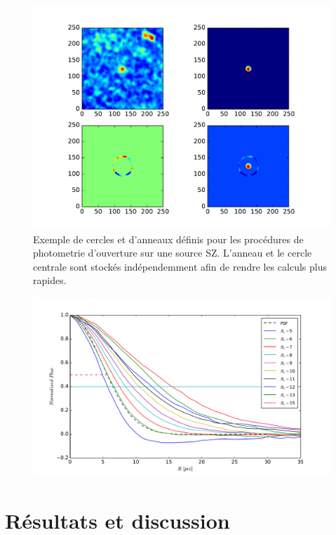 \documentclass[a4paper,11pt]{article}
\begin{document}
\begin{figure}[h!]
  \centering
  \label{photometrie d'ouverture}
  \includegraphics[scale = 0.8]{exemple_photometrie_d'ouverture.pdf}
  \caption{Exemple de cercles et d'anneaux définis pour les procédures de photometrie d'ouverture sur une source SZ. 
  L'anneau et le cercle centrale sont stockés indépendemment afin de rendre les calculs plus rapides.}
\end{figure}

\begin{figure}[h!]
  \centering
  \label{radius}
  \includegraphics[scale = 0.5]{radius.pdf}
  \caption{}
\end{figure}

\section{Résultats et discussion}
\end{document}
